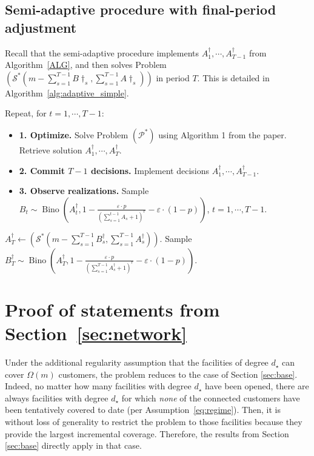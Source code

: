 \documentclass[nonblindrev]{informs3noheader}
\DeclareMathOperator\Bino{Bino}
\def\calP{\mathcal{P}}
\def\calS{\mathcal{S}}
\begin{document}
\subsection{Semi-adaptive procedure with final-period adjustment}

Recall that the semi-adaptive procedure implements $A^\dagger_1,\cdots,A^\dagger_{T-1}$ from Algorithm~\ref{ALG}, and then solves Problem $\left(\calS^*\left(m-\sum_{s=1}^{T-1}B\dagger_s,\sum_{s=1}^{T-1} A\dagger_s\right)\right)$ in period $T$. This is detailed in Algorithm~\ref{alg:adaptive_simple}.

\begin{algorithm} [h!]
    \caption{Semi-adaptive algorithm to solve Problem $(\calP^*)$.}\small
    \label{alg:adaptive_simple}
    \begin{algorithmic}
    \item Repeat, for $t=1,\cdots,T-1$:
    \begin{itemize}
        \item[] \textbf{1. Optimize.} Solve Problem $(\calP^*)$ using Algorithm 1 from the paper. Retrieve solution $A^\dagger_1,\cdots,A^\dagger_{T}$.
        \item[] \textbf{2. Commit $T-1$ decisions.} Implement decisions $A^\dagger_1,\cdots,A^\dagger_{T-1}$.
        \item[] \textbf{3. Observe realizations.} Sample $B_t\sim \Bino\left(A^\dagger_t, 1- \frac{\varepsilon\cdot p}{\left(\sum_{s=1}^{t-1} A_s +1\right)^r}-\varepsilon\cdot(1-p)\right)$, $t=1,\cdots,T-1$.
    \end{itemize}
\item $A^\dagger_T\gets\left(\calS^*\left(m-\sum_{s=1}^{T-1}B^\dagger_s,\sum_{s=1}^{T-1} A^\dagger_s\right)\right)$. Sample $B^\dagger_T\sim \Bino\left(A^\dagger_T, 1- \frac{\varepsilon\cdot p}{\left(\sum_{s=1}^{T-1} A^\dagger_s +1\right)^r}-\varepsilon\cdot(1-p)\right)$.
    \end{algorithmic}
    \end{algorithm}
    
\section{Proof of statements from Section~\ref{sec:network}}
\label{app:network}

Under the additional regularity assumption that the facilities of degree $d_\star$ can cover $\Omega(m)$ customers, the problem reduces to the case of Section \ref{sec:base}. Indeed, no matter how many facilities with degree $d_\star$ have been opened, there are always facilities with degree $d_\star$ for which \emph{none} of the connected customers have been tentatively covered to date (per Assumption~\ref{eq:regime}). Then, it is without loss of generality to restrict the problem to those facilities because they provide the largest incremental coverage. Therefore, the results from Section \ref{sec:base} directly apply in that case.
\end{document}
